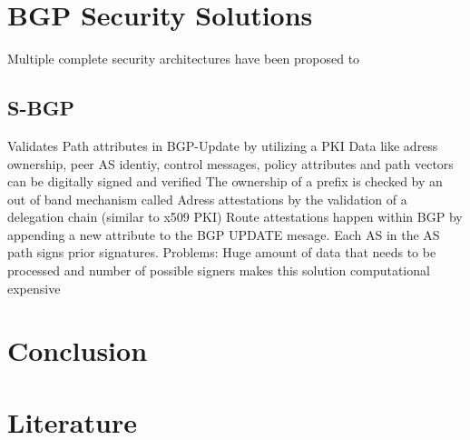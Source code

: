 \documentclass[12pt]{IEEEtran}
\begin{document}
       \section{BGP Security Solutions}

       Multiple complete security architectures have been proposed to 
       \subsection{S-BGP}
			Validates Path attributes in BGP-Update by utilizing a PKI
			Data like adress ownership, peer AS identiy, control messages, policy attributes and path vectors can be digitally signed and verified
			The ownership of a prefix is checked by an out of band mechanism called Adress attestations by the validation of a delegation chain (similar to x509 PKI)
			Route attestations happen within BGP by appending a new attribute to the BGP UPDATE mesage. Each AS in the AS path signs prior signatures.
			Problems: 
				Huge amount of data that needs to be processed and number of possible signers makes this solution computational expensive
				
	\section{Conclusion}				

	
	\section{Literature}
\end{document}
